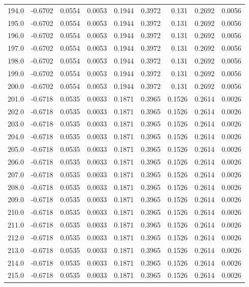 \begin{longtable}{lrrrrrrrr}
194.0 & -0.6702 & 0.0554 & 0.0053 & 0.1944 & 0.3972 & 0.131 & 0.2692 & 0.0056 \\
195.0 & -0.6702 & 0.0554 & 0.0053 & 0.1944 & 0.3972 & 0.131 & 0.2692 & 0.0056 \\
196.0 & -0.6702 & 0.0554 & 0.0053 & 0.1944 & 0.3972 & 0.131 & 0.2692 & 0.0056 \\
197.0 & -0.6702 & 0.0554 & 0.0053 & 0.1944 & 0.3972 & 0.131 & 0.2692 & 0.0056 \\
198.0 & -0.6702 & 0.0554 & 0.0053 & 0.1944 & 0.3972 & 0.131 & 0.2692 & 0.0056 \\
199.0 & -0.6702 & 0.0554 & 0.0053 & 0.1944 & 0.3972 & 0.131 & 0.2692 & 0.0056 \\
200.0 & -0.6702 & 0.0554 & 0.0053 & 0.1944 & 0.3972 & 0.131 & 0.2692 & 0.0056 \\
201.0 & -0.6718 & 0.0535 & 0.0033 & 0.1871 & 0.3965 & 0.1526 & 0.2614 & 0.0026 \\
202.0 & -0.6718 & 0.0535 & 0.0033 & 0.1871 & 0.3965 & 0.1526 & 0.2614 & 0.0026 \\
203.0 & -0.6718 & 0.0535 & 0.0033 & 0.1871 & 0.3965 & 0.1526 & 0.2614 & 0.0026 \\
204.0 & -0.6718 & 0.0535 & 0.0033 & 0.1871 & 0.3965 & 0.1526 & 0.2614 & 0.0026 \\
205.0 & -0.6718 & 0.0535 & 0.0033 & 0.1871 & 0.3965 & 0.1526 & 0.2614 & 0.0026 \\
206.0 & -0.6718 & 0.0535 & 0.0033 & 0.1871 & 0.3965 & 0.1526 & 0.2614 & 0.0026 \\
207.0 & -0.6718 & 0.0535 & 0.0033 & 0.1871 & 0.3965 & 0.1526 & 0.2614 & 0.0026 \\
208.0 & -0.6718 & 0.0535 & 0.0033 & 0.1871 & 0.3965 & 0.1526 & 0.2614 & 0.0026 \\
209.0 & -0.6718 & 0.0535 & 0.0033 & 0.1871 & 0.3965 & 0.1526 & 0.2614 & 0.0026 \\
210.0 & -0.6718 & 0.0535 & 0.0033 & 0.1871 & 0.3965 & 0.1526 & 0.2614 & 0.0026 \\
211.0 & -0.6718 & 0.0535 & 0.0033 & 0.1871 & 0.3965 & 0.1526 & 0.2614 & 0.0026 \\
212.0 & -0.6718 & 0.0535 & 0.0033 & 0.1871 & 0.3965 & 0.1526 & 0.2614 & 0.0026 \\
213.0 & -0.6718 & 0.0535 & 0.0033 & 0.1871 & 0.3965 & 0.1526 & 0.2614 & 0.0026 \\
214.0 & -0.6718 & 0.0535 & 0.0033 & 0.1871 & 0.3965 & 0.1526 & 0.2614 & 0.0026 \\
215.0 & -0.6718 & 0.0535 & 0.0033 & 0.1871 & 0.3965 & 0.1526 & 0.2614 & 0.0026 \\

\end{longtable}
